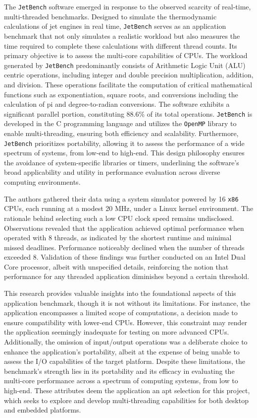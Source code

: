 The \texttt{JetBench} software emerged in response to the observed scarcity of real-time, multi-threaded benchmarks. Designed to simulate the thermodynamic calculations of jet engines in real time, \texttt{JetBench} serves as an application benchmark that not only simulates a realistic workload but also measures the time required to complete these calculations with different thread counts. Its primary objective is to assess the multi-core capabilities of CPUs. The workload generated by \texttt{JetBench} predominantly consists of Arithmetic Logic Unit (ALU) centric operations, including integer and double precision multiplication, addition, and division. These operations facilitate the computation of critical mathematical functions such as exponentiation, square roots, and conversions including the calculation of pi and degree-to-radian conversions. The software exhibits a significant parallel portion, constituting 88.6\% of its total operations. \texttt{JetBench} is developed in the C programming language and utilizes the \texttt{OpenMP} library to enable multi-threading, ensuring both efficiency and scalability. Furthermore, \texttt{JetBench} prioritizes portability, allowing it to assess the performance of a wide spectrum of systems, from low-end to high-end. This design philosophy ensures the avoidance of system-specific libraries or timers, underlining the software’s broad applicability and utility in performance evaluation across diverse computing environments.

The authors gathered their data using a system simulator powered by 16 \texttt{x86} CPUs, each running at a modest 20 MHz, under a Linux kernel environment. The rationale behind selecting such a low CPU clock speed remains undisclosed. Observations revealed that the application achieved optimal performance when operated with 8 threads, as indicated by the shortest runtime and minimal missed deadlines. Performance noticeably declined when the number of threads exceeded 8. Validation of these findings was further conducted on an Intel Dual Core processor, albeit with unspecified details, reinforcing the notion that performance for any threaded application diminishes beyond a certain threshold.

This research provides valuable insights into the foundational aspects of this application benchmark, though it is not without its limitations. For instance, the application encompasses a limited scope of computations, a decision made to ensure compatibility with lower-end CPUs. However, this constraint may render the application seemingly inadequate for testing on more advanced CPUs. Additionally, the omission of input/output operations was a deliberate choice to enhance the application's portability, albeit at the expense of being unable to assess the I/O capabilities of the target platform. Despite these limitations, the benchmark's strength lies in its portability and its efficacy in evaluating the multi-core performance across a spectrum of computing systems, from low to high-end. These attributes deem the application an apt selection for this project, which seeks to explore and develop multi-threading capabilities for both desktop and embedded platforms.

